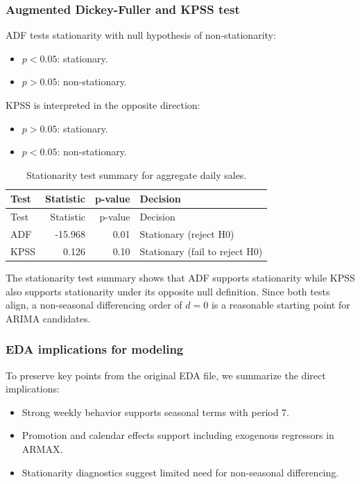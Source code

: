 \documentclass[
  12pt,
]{article}
\providecommand{\tightlist}{%
  \setlength{\itemsep}{0pt}\setlength{\parskip}{0pt}}
\begin{document}
\subsubsection{Augmented Dickey-Fuller and KPSS
test}\label{augmented-dickey-fuller-and-kpss-test}

ADF tests stationarity with null hypothesis of non-stationarity:

\begin{itemize}
\tightlist
\item
  \(p < 0.05\): stationary.
\item
  \(p > 0.05\): non-stationary.
\end{itemize}

KPSS is interpreted in the opposite direction:

\begin{itemize}
\tightlist
\item
  \(p > 0.05\): stationary.
\item
  \(p < 0.05\): non-stationary.
\end{itemize}

\begin{longtable}[]{@{}lrrl@{}}
\caption{Stationarity test summary for aggregate daily
sales.}\tabularnewline
\toprule\noalign{}
Test & Statistic & p-value & Decision \\
\midrule\noalign{}
\endfirsthead
\toprule\noalign{}
Test & Statistic & p-value & Decision \\
\midrule\noalign{}
\endhead
\bottomrule\noalign{}
\endlastfoot
ADF & -15.968 & 0.01 & Stationary (reject H0) \\
KPSS & 0.126 & 0.10 & Stationary (fail to reject H0) \\
\end{longtable}

The stationarity test summary shows that ADF supports stationarity while
KPSS also supports stationarity under its opposite null definition.
Since both tests align, a non-seasonal differencing order of \(d = 0\)
is a reasonable starting point for ARIMA candidates.

\subsubsection{EDA implications for
modeling}\label{eda-implications-for-modeling}

To preserve key points from the original EDA file, we summarize the
direct implications:

\begin{itemize}
\tightlist
\item
  Strong weekly behavior supports seasonal terms with period 7.
\item
  Promotion and calendar effects support including exogenous regressors
  in ARMAX.
\item
  Stationarity diagnostics suggest limited need for non-seasonal
  differencing.
\end{itemize}
\end{document}
